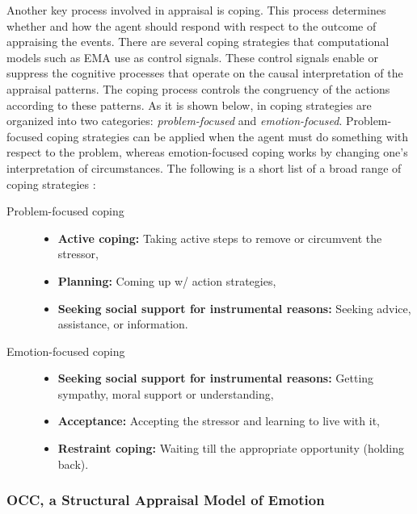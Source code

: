 \documentclass[12pt]{report}
\begin{document}
Another key process involved in appraisal is coping. This process determines
whether and how the agent should respond with respect to the outcome of
appraising the events. There are several coping strategies that computational
models such as EMA \cite{gratch:domain-independent} use as control signals.
These control signals enable or suppress the cognitive processes that operate on
the causal interpretation of the appraisal patterns. The coping process controls
the congruency of the actions according to these patterns. As it is shown below,
in \cite{gratch:domain-independent} coping strategies are organized into two
categories: \textit{problem-focused} and \textit{emotion-focused}.
Problem-focused coping strategies can be applied when the agent must do
something with respect to the problem, whereas emotion-focused coping works by
changing one's interpretation of circumstances. The following is a short list of
a broad range of coping strategies \cite{gratch:domain-independent}:

\begin{description}
  \item[Problem-focused coping] \hfill
	\begin{itemize}
	  \item \textbf{Active coping:} Taking active steps to remove or circumvent the
	  stressor,
	  \item \textbf{Planning:} Coming up w/ action strategies,
	  \item \textbf{Seeking social support for instrumental reasons:} Seeking
	  advice, assistance, or information.
	\end{itemize}
  \item[Emotion-focused coping] \hfill
    \begin{itemize}
	  \item \textbf{Seeking social support for instrumental reasons:} Getting
	  sympathy, moral support or understanding,
	  \item \textbf{Acceptance:} Accepting the stressor and learning to live with
	  it,
	  \item \textbf{Restraint coping:} Waiting till the appropriate opportunity
	  (holding back).
	\end{itemize}
\end{description}

\subsubsection{OCC, a Structural Appraisal Model of Emotion}
\end{document}
